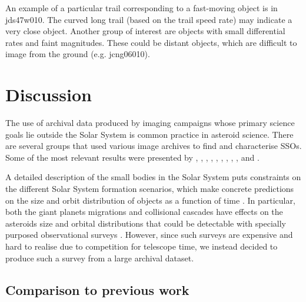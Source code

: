 \documentclass{aa}
\begin{document}
An example of a particular trail corresponding to a fast-moving object is in jds47w010. The curved long trail (based on the trail speed rate) may indicate a very close object. Another group of interest are objects with small differential rates and faint magnitudes. These could be distant objects, which are difficult to image from the ground (e.g. jcng06010).

\section{Discussion}
\label{discussionsection}

The use of archival data produced by imaging campaigns whose primary science goals lie outside the Solar System is common practice in asteroid science. There are several groups that used various image archives to find and characterise SSOs.  Some of the most relevant results were presented by \cite{Gwyn2012}, \cite{Vaduvescu2013}, \cite{Carry2016}, \cite{Popescu2016}, \cite{Vaduvescu2017}, \cite{Mahlke2018_SSO}, \cite{Mahlke2019}, \cite{Cortes2019}, \cite{Vaduvescu2020}, and \citet{Racero2022}.

A detailed description of the small bodies in the Solar System puts constraints on the different Solar System formation scenarios, which make concrete predictions on the size and orbit distribution of objects as a function of time \citep{2015aste.book..701B}. In particular, both the giant planets migrations and collisional cascades have effects on the asteroids size and orbital distributions that could be detectable with specially purposed observational surveys \citep{Morbidelli2005,Morbidelli2009}. However, since such surveys are expensive and hard to realise due to competition for telescope time, we instead decided to produce such a survey from a large archival dataset. 

\subsection{Comparison to previous work}
\label{previous_work}
\end{document}
